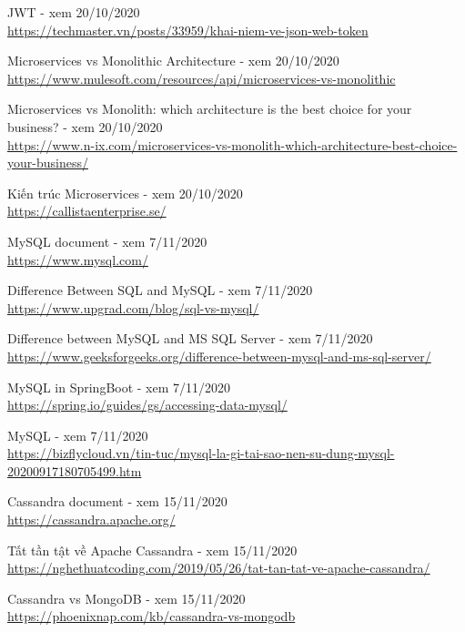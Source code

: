 \documentclass[12pt,a4paper,oneside]{book}
\begin{document}
\begin{thebibliography}{80}
         JWT - xem 20/10/2020\\
        \url{https://techmaster.vn/posts/33959/khai-niem-ve-json-web-token}
        
        \bibitem{} Microservices vs Monolithic Architecture - xem 20/10/2020\\
        \url{https://www.mulesoft.com/resources/api/microservices-vs-monolithic}
        
        \bibitem{} Microservices vs Monolith: which architecture is the best choice for your business? - xem 20/10/2020\\
        \url{https://www.n-ix.com/microservices-vs-monolith-which-architecture-best-choice-your-business/}
        
        \bibitem{} Kiến trúc Microservices - xem 20/10/2020\\
        \url{https://callistaenterprise.se/}
        
        \bibitem{} MySQL document - xem 7/11/2020\\
        \url{https://www.mysql.com/}
        
        \bibitem{} Difference Between SQL and MySQL - xem 7/11/2020\\
        \url{https://www.upgrad.com/blog/sql-vs-mysql/}
        
        \bibitem{} Difference between MySQL and MS SQL Server - xem 7/11/2020\\
        \url{https://www.geeksforgeeks.org/difference-between-mysql-and-ms-sql-server/}
        
         \bibitem{} MySQL in SpringBoot - xem 7/11/2020\\
        \url{https://spring.io/guides/gs/accessing-data-mysql/}
        
        \bibitem{} MySQL - xem 7/11/2020\\
        \url{https://bizflycloud.vn/tin-tuc/mysql-la-gi-tai-sao-nen-su-dung-mysql-20200917180705499.htm}
        
        \bibitem{} Cassandra document - xem 15/11/2020\\
        \url{https://cassandra.apache.org/}
        
        \bibitem{} Tất tần tật về Apache Cassandra - xem 15/11/2020\\
        \url{https://nghethuatcoding.com/2019/05/26/tat-tan-tat-ve-apache-cassandra/}
        
        \bibitem{} Cassandra vs MongoDB - xem 15/11/2020\\
        \url{https://phoenixnap.com/kb/cassandra-vs-mongodb}
        

\end{thebibliography}
\end{document}
